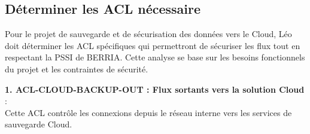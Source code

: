 \newpage

\subsection*{Déterminer les ACL nécessaire}
{}

Pour le projet de sauvegarde et de sécurisation des données vers le Cloud, Léo doit déterminer les ACL spécifiques qui permettront de sécuriser les flux tout en respectant la PSSI de BERRIA. Cette analyse se base sur les besoins fonctionnels du projet et les contraintes de sécurité.

\medskip

\noindent \textbf{1. ACL-CLOUD-BACKUP-OUT : Flux sortants vers la solution Cloud} :\\
Cette ACL contrôle les connexions depuis le réseau interne vers les services de sauvegarde Cloud.

